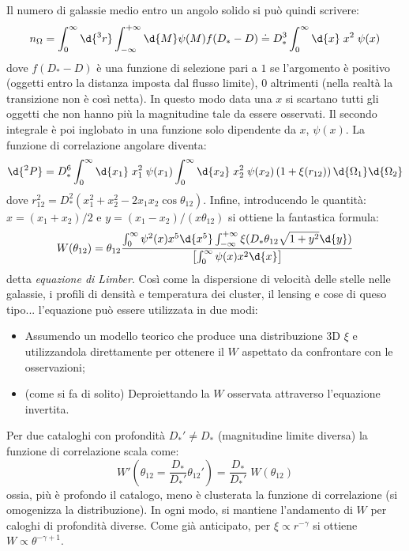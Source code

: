 Il numero di galassie medio entro un angolo solido si può quindi scrivere:
\begin{equation}
    n_\Omega = \int^\infty _0 \d{^3r}\int_{-\infty}^{+\infty}\d{M}\psi (M) f(D_*-D) \doteq D_*^3 \int_0^\infty \d{x}\; x^2 \; \psi(x)
\end{equation}
dove $f(D_*-D)$ è una funzione di selezione pari a $1$ se l'argomento è positivo (oggetti entro la distanza imposta dal flusso limite), $0$ altrimenti (nella realtà la transizione non è così netta). In questo modo data una $x$ si scartano tutti gli oggetti che non hanno più la magnitudine tale da essere osservati. Il secondo integrale è poi inglobato in una funzione solo dipendente da $x$, $\psi(x)$. La funzione di correlazione angolare diventa:
\begin{equation}
    \d{^2P}=D_*^6 \int_0^\infty \d{x_1}\; x_1^2 \; \psi(x_1) \int_0^\infty \d{x_2}\; x_2^2 \; \psi(x_2) \left(1+\xi(r_{12})\right)\d{\Omega_1}\d{\Omega_2}
\end{equation}
dove $r_{12}^2=D_*^2 (x_1^2+x_2^2-2x_1x_2\cos \theta_{12})$. Infine, introducendo le quantità: $x=(x_1+x_2)/2$ e $y=(x_1-x_2)/(x\theta_{12})$ si ottiene la fantastica formula:
\begin{equation}
    W(\theta_{12})=\theta_{12}\frac{\int_0^\infty \psi^2(x)x^5\d{x^5} \int_{-\infty}^{+\infty}\xi(D_*\theta_{12}\sqrt{1+y^2}\d{y})}{\left[\int_0^\infty \psi(x)x^2\d{x} \right]}
\end{equation}
detta \textit{equazione di Limber}. Così come la dispersione di velocità delle stelle nelle galassie, i profili di densità e temperatura dei cluster, il lensing e cose di queso tipo... l'equazione può essere utilizzata in due modi:
\begin{itemize}
    \item Assumendo un modello teorico che produce una distribuzione 3D $\xi$ e utilizzandola direttamente per ottenere il $W$ aspettato da confrontare con le osservazioni;
    \item (come si fa di solito) Deproiettando la $W$ osservata attraverso l'equazione invertita.
\end{itemize}
Per due cataloghi con profondità $D_*'\neq D_*$ (magnitudine limite diversa) la funzione di correlazione scala come:
\begin{equation*}
    W'\left(\theta_{12}=\frac{D_*}{D_*'}\theta_{12}'\right)=\frac{D_*}{D_*'}\; W(\theta_{12})
\end{equation*}
ossia, più è profondo il catalogo, meno è clusterata la funzione di correlazione (si omogenizza la distribuzione). In ogni modo, si mantiene l'andamento di $W$ per caloghi di profondità diverse. Come già anticipato, per $\xi \propto r^{-\gamma}$ si ottiene $W\propto \theta^{-\gamma +1}$.

